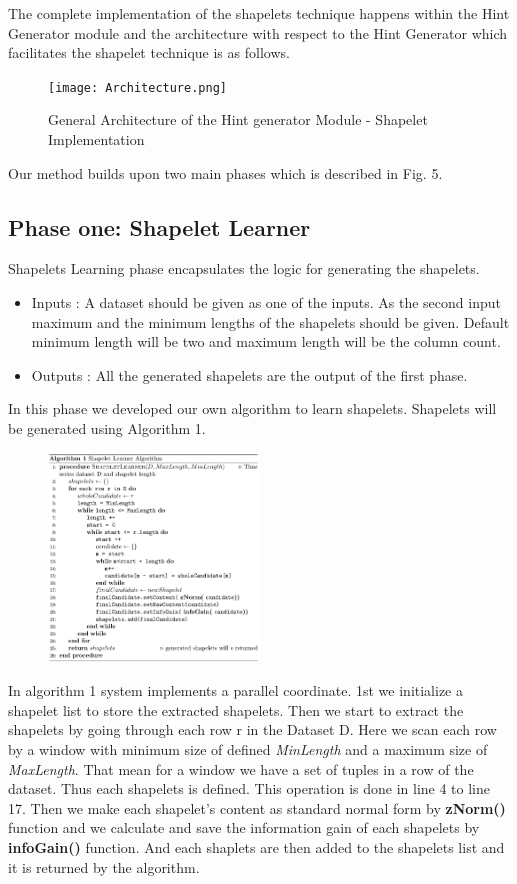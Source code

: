 \documentclass[letterpaper, 10 pt, conference]{IEEEtran}  %
\begin{document}
The complete implementation of the shapelets technique happens within the Hint Generator module and the architecture with respect to the Hint Generator which facilitates the shapelet technique is as follows.

\begin{figure}[h!]
\texttt{[image: Architecture.png]}
\caption{General Architecture of the Hint generator Module - Shapelet Implementation}
\end{figure}

Our method builds upon two main phases which is described in Fig. 5.

\subsection{Phase one: Shapelet Learner}
Shapelets Learning phase encapsulates the logic for generating the shapelets.
\begin{itemize}
\item Inputs : A dataset should be given as one of the inputs. As the second input maximum and the minimum lengths of the shapelets should be given. Default minimum length will be two and maximum length will be the column count.
\item Outputs : All the generated shapelets are the output of the first phase.
\end{itemize}

In this phase we developed our own algorithm to learn shapelets. Shapelets will be generated using Algorithm 1.

\begin{figure}[h!]
\includegraphics[width=0.5\textwidth]{algo1.png}
\end{figure}


In algorithm 1 system implements a parallel coordinate. 1st we initialize a shapelet list to store the extracted shapelets. Then we start to extract the shapelets by going through each row r in the Dataset D. Here we scan each row by a window with minimum size of defined \textit{MinLength} and a maximum size of \textit{MaxLength}. That mean for a window we have a set of tuples in a row of the dataset. Thus each shapelets is defined. This operation is done in line 4 to line 17. Then we make each shapelet’s content as standard normal form by \textbf{zNorm()} function and we calculate and save the information gain of each shapelets by \textbf{infoGain()} function. And each shaplets are then added to the shapelets list and it is returned by the algorithm.
\end{document}
